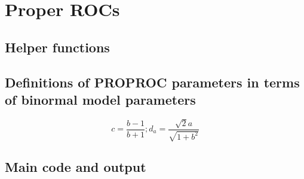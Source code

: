 \documentclass[]{book}
\begin{document}
\hypertarget{ProperROCs}{%
\chapter{Proper ROCs}\label{ProperROCs}}

\hypertarget{helper-functions}{%
\section{Helper functions}\label{helper-functions}}

\hypertarget{definitions-of-proproc-parameters-in-terms-of-binormal-model-parameters}{%
\section{Definitions of PROPROC parameters in terms of binormal model parameters}\label{definitions-of-proproc-parameters-in-terms-of-binormal-model-parameters}}

\[c=\frac{b-1}{b+1};{{d}_{a}}=\frac{\sqrt{2}a}{\sqrt{1+{{b}^{2}}}}\]

\hypertarget{main-code-and-output}{%
\section{Main code and output}\label{main-code-and-output}}
\end{document}
